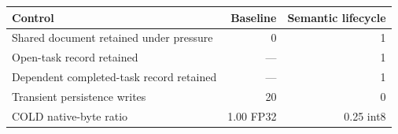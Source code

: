\begin{tabular}{lrr}\toprule
Control & Baseline & Semantic lifecycle \\
\midrule
Shared document retained under pressure & 0 & 1 \\
Open-task record retained & --- & 1 \\
Dependent completed-task record retained & --- & 1 \\
Transient persistence writes & 20 & 0 \\
COLD native-byte ratio & 1.00 FP32 & 0.25 int8 \\
\bottomrule\end{tabular}
